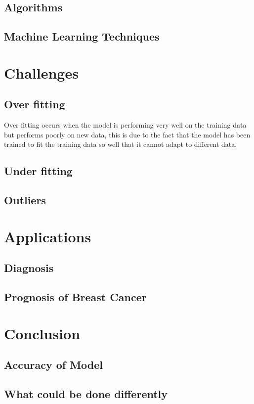 \documentclass[conference]{IEEEtran}
\begin{document}
\subsection{Algorithms}
\subsection{Machine Learning Techniques}
\section{Challenges}
\subsection{Over fitting}
Over fitting occurs when the model is performing very well on the training data but performs poorly on new data, this is due to the fact that the model has been trained to fit the training data so well that it cannot adapt to different data.
\subsection{Under fitting}
\subsection{Outliers}
\section{Applications}
\subsection{Diagnosis}
\subsection{Prognosis of Breast Cancer}
\section{Conclusion}
\subsection{Accuracy of Model}
\subsection{What could be done differently}
\newpage
\clearpage
\printbibliography
\end{document}
